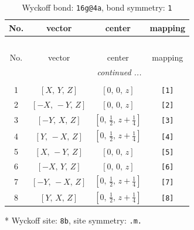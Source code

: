 \documentclass[fleqn,8pt]{jsarticle}
\begin{document}
\renewcommand{\arraystretch}{1.2}
\begin{longtable}{cccc}
\caption{Wyckoff bond: {\tt 16g@4a}, bond symmetry: {\tt 1}}
 \\
 \hline \hline
No. & vector & center & mapping \\ \hline \endfirsthead

\multicolumn{3}{l}{\tablename\ \thetable{}} \\
 \hline \hline
No. & vector & center & mapping \\ \hline \endhead

 \hline \hline
\multicolumn{3}{r}{\footnotesize\it continued ...} \\ \endfoot

 \hline \hline
\multicolumn{3}{r}{} \\ \endlastfoot

1 & $\left[ X,\, Y,\, Z \right]$ & $\left[ 0,\, 0,\, z \right]$ & {\tt [1]} \\ \hline
2 & $\left[ - X,\, - Y,\, Z \right]$ & $\left[ 0,\, 0,\, z \right]$ & {\tt [2]} \\ \hline
3 & $\left[ - Y,\, X,\, Z \right]$ & $\left[ 0,\, \frac{1}{2},\, z + \frac{1}{4} \right]$ & {\tt [3]} \\ \hline
4 & $\left[ Y,\, - X,\, Z \right]$ & $\left[ 0,\, \frac{1}{2},\, z + \frac{1}{4} \right]$ & {\tt [4]} \\ \hline
5 & $\left[ X,\, - Y,\, Z \right]$ & $\left[ 0,\, 0,\, z \right]$ & {\tt [5]} \\ \hline
6 & $\left[ - X,\, Y,\, Z \right]$ & $\left[ 0,\, 0,\, z \right]$ & {\tt [6]} \\ \hline
7 & $\left[ - Y,\, - X,\, Z \right]$ & $\left[ 0,\, \frac{1}{2},\, z + \frac{1}{4} \right]$ & {\tt [7]} \\ \hline
8 & $\left[ Y,\, X,\, Z \right]$ & $\left[ 0,\, \frac{1}{2},\, z + \frac{1}{4} \right]$ & {\tt [8]} \\
\end{longtable}
* Wyckoff site: {\tt 8b}, site symmetry: {\tt .m.}
\renewcommand{\arraystretch}{1.2}
\end{document}
